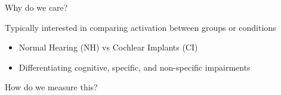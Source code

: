 \documentclass{beamer}
\providecommand{\cn}[1]{\textcolor{blue}{#1}}
\begin{document}
\begin{frame}{Why do we care?}

Typically interested in comparing activation between groups or conditions \vspace{2mm}

\begin{itemize}
\item Normal Hearing (NH) vs Cochlear Implants (CI) \vspace{2mm}
\item Differentiating cognitive, specific, and non-specific impairments \vspace{2mm}
\end{itemize}

How do we measure this?


\end{frame}

%
%
%
%
%
%
\end{document}
